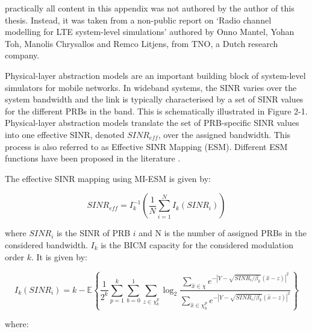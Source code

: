 \label{ap:miesm}

 practically all content in this appendix was not authored by the author of this thesis. Instead, it was taken from a non-public report on `Radio channel modelling for LTE system-level simulations' authored by Onno Mantel, Yohan Toh, Manolis Chrysallos and Remco Litjens, from TNO, a Dutch research company.

Physical-layer abstraction models are an important building block of system-level simulators for mobile networks. In wideband systems, the \acs{SINR} varies over the system bandwidth and the link is typically characterised by a set of SINR values for the different \acsp{PRB} in the band. This is schematically illustrated in Figure 2-1. Physical-layer abstraction models translate the set of PRB-specific SINR values into one effective SINR, denoted $SINR_{eff}$, over the assigned bandwidth. This process is also referred to as Effective SINR Mapping (ESM). Different ESM functions have been proposed in the literature \cite{1651855}.



The effective SINR mapping using MI-ESM is given by:

\begin{equation} \label{eq:miesm}
    SINR_{eff} = I_k^{-1} \left( \frac{1}{N} \sum_{i=1}^N I_k\left(SINR_i\right)\right)
\end{equation}

where $SINR_i$ is the SINR of PRB $i$ and N is the number of assigned PRBs in the considered bandwidth. $I_k$ is the \ac{BICM} capacity for the considered modulation order $k$. It is given by:


\begin{equation}
    I_k(SINR_i) = k - \mathbb{E}\left\{ \frac{1}{2^k} \sum_{p=1}^k \sum_{b=0}^1 \sum_{z \in \mathcal{\chi}_b^p} \log_2 \frac{\sum_{\hat{x} \in \chi} e^{- \left| Y - \sqrt{SINR_i / \beta_k} (\hat{x} - z)  \right|^2}}{\sum_{\hat{x} \in \chi_b^p} e^{- \left| Y - \sqrt{SINR_i / \beta_k} (\hat{x} - z)  \right|^2}}\right\} 
\end{equation}


where:

